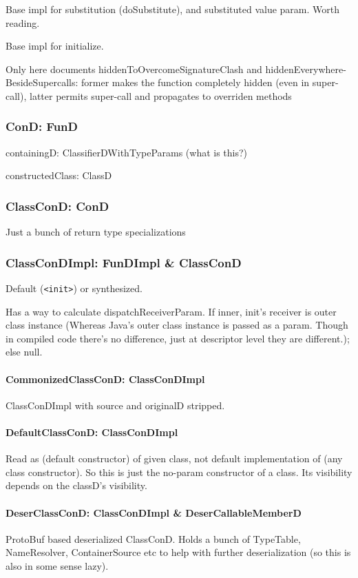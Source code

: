 \documentclass{article}
\begin{document}
Base impl for substitution (doSubstitute), and substituted value param. Worth reading.

Base impl for initialize.

\label{sec:FunDImpl-hidden}
Only here documents hiddenToOvercomeSignatureClash and hiddenEverywhere-BesideSupercalls: former makes the function completely hidden (even in super-call), latter permits super-call and propagates to overriden methods

\subsubsection{ConD: FunD}

containingD: ClassifierDWithTypeParams (what is this?)

constructedClass: ClassD

\subsubsection{ClassConD: ConD}

Just a bunch of return type specializations

\subsubsection{ClassConDImpl: FunDImpl \& ClassConD}

Default (\texttt{<init>}) or synthesized.

Has a way to calculate dispatchReceiverParam. If inner, init's receiver is outer class instance (Whereas Java's outer class instance is passed as a param. Though in compiled code there's no difference, just at descriptor level they are different.); else null.

\paragraph{CommonizedClassConD: ClassConDImpl}
ClassConDImpl with source and originalD stripped.

\paragraph{DefaultClassConD: ClassConDImpl}
Read as (default constructor) of given class, not default implementation of (any class constructor). So this is just the no-param constructor of a class. Its visibility depends on the classD's visibility.

\paragraph{DeserClassConD: ClassConDImpl \& DeserCallableMemberD}
ProtoBuf based deserialized ClassConD. Holds a bunch of TypeTable, NameResolver, ContainerSource etc to help with further deserialization (so this is also in some sense lazy).
\end{document}
